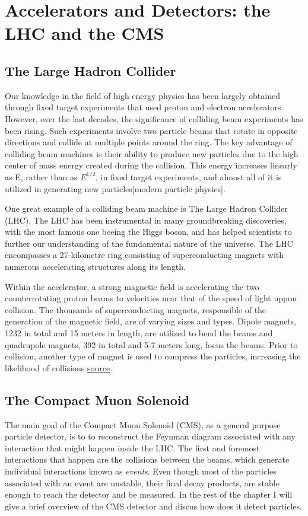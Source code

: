 
\section{Accelerators and Detectors: the LHC and the CMS}
\label{sec:org3878a16}
\subsection{The Large Hadron Collider}
\label{sec:org5906b28}
Our knowledge in the field of high energy physics has been largely obtained through fixed target experiments that used proton and electron accelerators. However, over the last decades, the significance of colliding beam experiments has been rising. Such experiments involve two particle beams that rotate in opposite directions and collide at multiple points around the ring. The key advantage of colliding beam machines is their ability to produce new particles due to the high center of mass energy created during the collision. This energy increases linearly as E, rather than as \(E^{1/2}\), in fixed target experiments, and almost all of it is utilized in generating new particles[modern particle physics].

One great example of a colliding beam machine is The Large Hadron Collider (LHC).  The LHC has been instrumental in many groundbreaking discoveries, with the most famous one beeing the Higgs boson, and has helped scientists to further our understanding of the fundamental nature of the universe. The LHC encompasses a 27-kilometre ring consisting of superconducting magnets with numerous accelerating structures along its length.

Within the accelerator, a strong magnetic field is accelerating the two counterrotating proton beams to velocities near that of the speed of light uppon collision.  The thousands of  superconducting magnets, responsible of the generation of the magnetic field, are of varying sizes and types. Dipole magnets, 1232 in total and 15 meters in length, are utilized to bend the beams and quadrupole magnets, 392 in total and 5-7 meters long, focus the beams. Prior to collision, another type of magnet is used to compress the particles, increasing the likelihood of collisions \href{https://www.lhc-closer.es/taking\_a\_closer\_look\_at\_lhc/0.momentum}{source}.
\subsection{The Compact Muon Solenoid}
\label{sec:orgccfbfe1}
The main goal of  the Compact Muon Solenoid (CMS), as a general purpose particle detector, is to  to reconstruct the Feynman diagram associated with any interaction that might happen inside the LHC. The first and foremost interactions that happen are the collisions between the beams, which generate individual interactions known as \emph{events}. Even though most of the particles associated with an event are unstable, their final decay products, are stable enough to reach the detector and be measured. In the rest of the chapter I will give a brief overview of the CMS detector and discus how does it detect particles.
